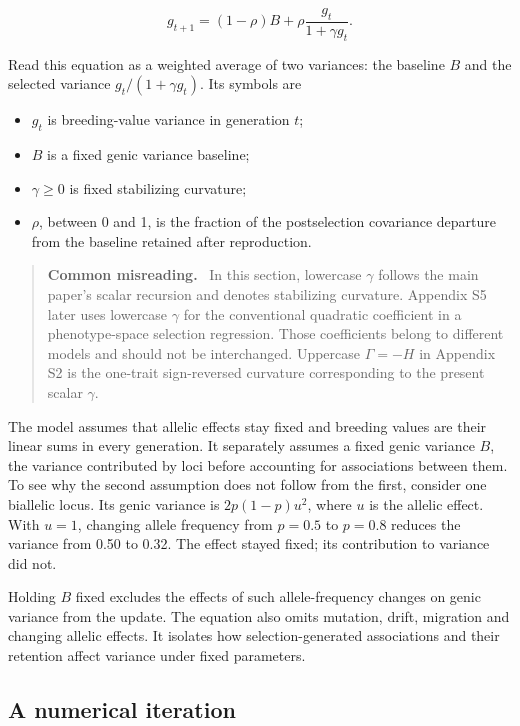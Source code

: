 \documentclass[11pt]{article}
\newenvironment{commonreading}
  {\begin{quote}\small\noindent\textbf{Common misreading.}\ }
  {\end{quote}}
\begin{document}
\begin{equation}
g_{t+1}=(1-\rho)B+\rho\frac{g_t}{1+\gamma g_t}.
\label{eq:guide-recursion}
\end{equation}

Read this equation as a weighted average of two variances: the baseline $B$ and the selected variance $g_t/(1+\gamma g_t)$. Its symbols are

\begin{itemize}
\item $g_t$ is breeding-value variance in generation $t$;
\item $B$ is a fixed genic variance baseline;
\item $\gamma\geq0$ is fixed stabilizing curvature;
\item $\rho$, between 0 and 1, is the fraction of the postselection covariance
departure from the baseline retained after reproduction.
\end{itemize}

\begin{commonreading}
In this section, lowercase $\gamma$ follows the main paper's scalar recursion
and denotes stabilizing curvature.  Appendix S5 later uses lowercase
$\gamma$ for the conventional quadratic coefficient in a phenotype-space
selection regression.  Those coefficients belong to different models and
should not be interchanged.  Uppercase $\Gamma=-H$ in Appendix S2 is the
one-trait sign-reversed curvature corresponding to the present scalar
$\gamma$.
\end{commonreading}

The model assumes that allelic effects stay fixed and breeding values are their linear sums in every generation. It separately assumes a fixed genic variance $B$, the variance contributed by loci before accounting for associations between them. To see why the second assumption does not follow from the first, consider one biallelic locus. Its genic variance is $2p(1-p)u^2$, where $u$ is the allelic effect. With $u=1$, changing allele frequency from $p=0.5$ to $p=0.8$ reduces the variance from 0.50 to 0.32. The effect stayed fixed; its contribution to variance did not.

Holding $B$ fixed excludes the effects of such allele-frequency changes on genic variance from the update. The equation also omits mutation, drift, migration and changing allelic effects. It isolates how selection-generated associations and their retention affect variance under fixed parameters.

\subsection{A numerical iteration}
\end{document}
